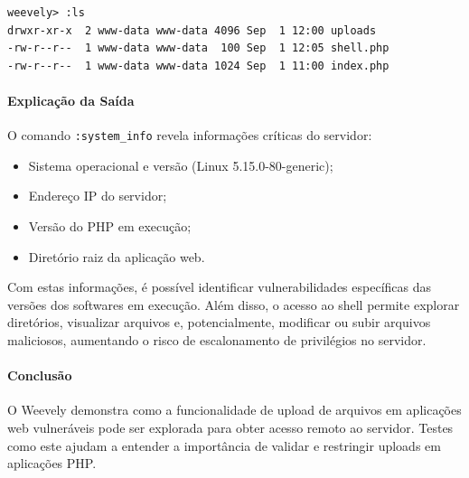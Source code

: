 \documentclass[12pt]{article}
\begin{document}
\begin{lstlisting}
weevely> :ls
drwxr-xr-x  2 www-data www-data 4096 Sep  1 12:00 uploads
-rw-r--r--  1 www-data www-data  100 Sep  1 12:05 shell.php
-rw-r--r--  1 www-data www-data 1024 Sep  1 11:00 index.php
\end{lstlisting}

\paragraph{Explicação da Saída}

O comando \texttt{:system\_info} revela informações críticas do servidor:

\begin{itemize}
  \item Sistema operacional e versão (Linux 5.15.0-80-generic);
  \item Endereço IP do servidor;
  \item Versão do PHP em execução;
  \item Diretório raiz da aplicação web.
\end{itemize}

Com estas informações, é possível identificar vulnerabilidades específicas das versões dos softwares em execução. Além disso, o acesso ao shell permite explorar diretórios, visualizar arquivos e, potencialmente, modificar ou subir arquivos maliciosos, aumentando o risco de escalonamento de privilégios no servidor.

\paragraph{Conclusão}

O Weevely demonstra como a funcionalidade de upload de arquivos em aplicações web vulneráveis pode ser explorada para obter acesso remoto ao servidor. Testes como este ajudam a entender a importância de validar e restringir uploads em aplicações PHP.
\end{document}
